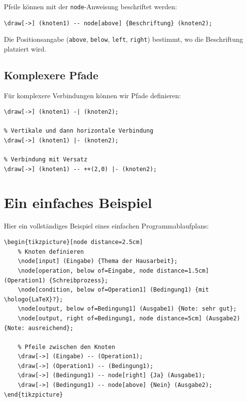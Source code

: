Pfeile können mit der \texttt{node}-Anweisung beschriftet werden:

\begin{lstlisting}[style=latex]
\draw[->] (knoten1) -- node[above] {Beschriftung} (knoten2);
\end{lstlisting}

Die Positionsangabe (\texttt{above}, \texttt{below}, \texttt{left}, \texttt{right}) bestimmt, wo die Beschriftung platziert wird.



\subsection{Komplexere Pfade}

Für komplexere Verbindungen können wir Pfade definieren:

\begin{lstlisting}[style=latex]
% Horizontale und dann vertikale Verbindung
\draw[->] (knoten1) -| (knoten2);

% Vertikale und dann horizontale Verbindung
\draw[->] (knoten1) |- (knoten2);

% Verbindung mit Versatz
\draw[->] (knoten1) -- ++(2,0) |- (knoten2);
\end{lstlisting}



\section{Ein einfaches Beispiel}

Hier ein vollständiges Beispiel eines einfachen Programmablaufplans:

\begin{lstlisting}[style=latex]
\begin{tikzpicture}[node distance=2.5cm]
	% Knoten definieren
	\node[input] (Eingabe) {Thema der Hausarbeit};
	\node[operation, below of=Eingabe, node distance=1.5cm] (Operation1) {Schreibprozess};
	\node[condition, below of=Operation1] (Bedingung1) {mit \hologo{LaTeX}?};
	\node[output, below of=Bedingung1] (Ausgabe1) {Note: sehr gut};	
	\node[output, right of=Bedingung1, node distance=5cm] (Ausgabe2) {Note: ausreichend};

	% Pfeile zwischen den Knoten
	\draw[->] (Eingabe) -- (Operation1);	
	\draw[->] (Operation1) -- (Bedingung1);	
	\draw[->] (Bedingung1) -- node[right] {Ja} (Ausgabe1);
	\draw[->] (Bedingung1) -- node[above] {Nein} (Ausgabe2);
\end{tikzpicture}
\end{lstlisting}

